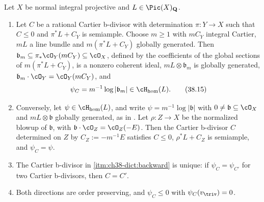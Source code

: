 \begin{proposition}
\label{prop:ch38-model-fs-dictionary}
Let $X$ be normal integral projective and $L\in\Pic(X)_{\mathbf Q}$.
\begin{enumerate}
\item\label{itm:ch38-dict:forward}
 Let $C$ be a rational Cartier b-divisor with determination
 $\pi:Y\to X$ such that $C\leq0$ and $\pi^*L+C_Y$ is semiample.
 Choose $m\geq1$ with $mC_Y$ integral Cartier, $mL$ a line bundle
 and $m(\pi^*L+C_Y)$ globally generated.  Then
 $\mathfrak b_m\subseteq\pi_*\cO_Y(mC_Y)\subseteq\cO_X$, defined
 by the coefficients of the global sections of
 $m(\pi^*L+C_Y)$, is a nonzero coherent ideal,
 $mL\otimes\mathfrak b_m$ is globally generated,
 $\mathfrak b_m\cdot\cO_Y=\cO_Y(mC_Y)$, and
\[
 \psi_C=m^{-1}\log|\mathfrak b_m|\in\cH_{\mathrm{hom}}(L).
\tag{38.15}\label{eq:ch38-forward-dictionary}
\]
\item\label{itm:ch38-dict:backward}
 Conversely, let $\psi\in\cH_{\mathrm{hom}}(L)$, and write
 $\psi=m^{-1}\log|\mathfrak b|$ with $0\neq\mathfrak b\subseteq\cO_X$
 and $mL\otimes\mathfrak b$ globally generated, as in
 .  Let $\rho:Z\to X$ be the normalized blowup
 of $\mathfrak b$, with $\mathfrak b\cdot\cO_Z=\cO_Z(-E)$.  Then the
 Cartier b-divisor $C$ determined on $Z$ by
 $C_Z:=-m^{-1}E$ satisfies $C\leq0$, $\rho^*L+C_Z$ is semiample,
 and $\psi_C=\psi$.
\item\label{itm:ch38-dict:unique}
 The Cartier b-divisor in \cref{itm:ch38-dict:backward} is unique: if
 $\psi_{C}=\psi_{C'}$ for two Cartier b-divisors, then $C=C'$.
\item\label{itm:ch38-dict:order}
 Both directions are order preserving, and
 $\psi_C\leq0$ with $\psi_C(v_{\triv})=0$.
\end{enumerate}
\end{proposition}

